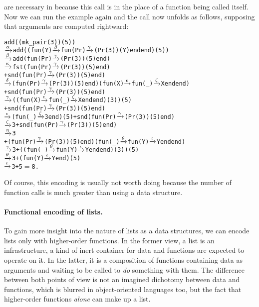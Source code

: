  are necessary in \Erlang because this call is in the
place of a function being called itself. Now we can run the example
again and the call now unfolds as follows, supposing that arguments
are computed rightward:
\begin{alltt}
add((mk_pair(3))(5))
  \(\smashedrightarrow{\alpha}\) add((fun(Y) \(\smashedrightarrow{\beta}\) fun(Pr) \(\smashedrightarrow{\gamma}\) (Pr(3))(Y) end end)(5))
  \(\smashedrightarrow{\beta}\) add(fun(Pr) \(\smashedrightarrow{\gamma}\) (Pr(3))(5) end)
  \(\smashedrightarrow{\kappa}\)   fst(fun(Pr) \(\smashedrightarrow{\gamma}\) (Pr(3))(5) end)
     + snd(fun(Pr) \(\smashedrightarrow{\gamma}\) (Pr(3))(5) end)
  \(\smashedrightarrow{\delta}\)   (fun(Pr)\(\smashedrightarrow{\gamma}\)(Pr(3))(5) end)(fun(X)\(\smashedrightarrow{\epsilon}\)fun(_)\(\smashedrightarrow{\zeta}\)X end end)
     + snd(fun(Pr) \(\smashedrightarrow{\gamma}\) (Pr(3))(5) end)
  \(\smashedrightarrow{\gamma}\)   ((fun(X) \(\smashedrightarrow{\epsilon}\) fun(_) \(\smashedrightarrow{\zeta}\) X end end)(3))(5)
     + snd(fun(Pr) \(\smashedrightarrow{\gamma}\) (Pr(3))(5) end)
  \(\smashedrightarrow{\epsilon}\) (fun(_) \(\smashedrightarrow{\zeta}\) 3 end)(5) + snd(fun(Pr) \(\smashedrightarrow{\gamma}\) (Pr(3))(5) end)
  \(\smashedrightarrow{\zeta}\) 3 + snd(fun(Pr) \(\smashedrightarrow{\gamma}\) (Pr(3))(5) end)
  \(\smashedrightarrow{\eta}\) 3
     + (fun(Pr)\(\smashedrightarrow{\gamma}\)(Pr(3))(5) end)(fun(_)\(\smashedrightarrow{\theta}\)fun(Y)\(\smashedrightarrow{\iota}\)Y end end)
  \(\smashedrightarrow{\gamma}\) 3 + ((fun(_) \(\smashedrightarrow{\theta}\) fun(Y) \(\smashedrightarrow{\iota}\) Y end end)(3))(5)
  \(\smashedrightarrow{\theta}\) 3 + (fun(Y) \(\smashedrightarrow{\iota}\) Y end)(5)
  \(\smashedrightarrow{\iota}\) 3 + 5 \(=\) 8.
\end{alltt}
Of course, this encoding is usually not worth doing because the number
of function calls is much greater than using a data
structure.

\medskip

\paragraph{Functional encoding of lists.}

To gain more insight into the nature of lists as a data structures, we
can encode lists only with higher\hyp{}order functions. In the former
view, a list is an infrastructure, a kind of inert container for data
and functions are expected to operate on it. In the latter, it is a
composition of functions containing data as arguments and waiting to
be called to \emph{do} something with them. The difference between
both points of view is not an imagined dichotomy between data and
functions, which is blurred in object\hyp{}oriented languages too, but
the fact that higher\hyp{}order functions \emph{alone} can make up a
list.

